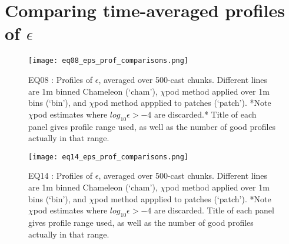 \documentclass[11pt]{article}
\begin{document}
\clearpage
\section{Comparing time-averaged profiles of $\epsilon$}

%
%
%


\begin{figure}[htbp]
\texttt{[image: eq08\_eps\_prof\_comparisons.png]}
\caption{EQ08 : Profiles of $\epsilon$, averaged over 500-cast chunks. Different lines are 1m binned Chameleon (`cham'), $\chi$pod method applied over 1m bins (`bin'), and $\chi$pod method appplied to patches (`patch'). *Note $\chi$pod estimates where $log_{10}\epsilon>-4$ are discarded.* Title of each panel gives profile range used, as well as the number of good profiles actually in that range.}
\label{eps_prof_comp_eq08}
\end{figure}


\begin{figure}[htbp]
\texttt{[image: eq14\_eps\_prof\_comparisons.png]}
\caption{EQ14 : Profiles of $\epsilon$, averaged over 500-cast chunks. Different lines are 1m binned Chameleon (`cham'), $\chi$pod method applied over 1m bins (`bin'), and $\chi$pod method appplied to patches (`patch'). *Note $\chi$pod estimates where $log_{10}\epsilon>-4$ are discarded. Title of each panel gives profile range used, as well as the number of good profiles actually in that range.}
\label{eps_prof_comp_eq14}
\end{figure}
\end{document}
